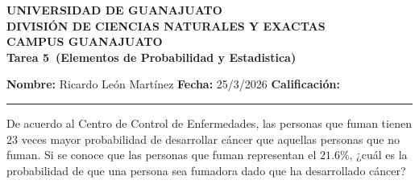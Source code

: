 \documentclass[12pt,a4paper]{article}
\newcommand{\alumno}{Ricardo León Martínez}
\newcommand{\materia}{Elementos de Probabilidad y Estadistica}
\newcommand{\tarea}{Tarea 5}
\newcommand{\fecha}{25/3/2026}
\begin{document}
    \begin{center}
        {\large\textbf{UNIVERSIDAD DE GUANAJUATO}}\\[0.3cm]
        {\normalsize\textbf{DIVISIÓN DE CIENCIAS NATURALES Y EXACTAS}}\\
        {\normalsize\textbf{CAMPUS GUANAJUATO}}\\[1cm]

        {\Large\textbf{\tarea\ (\materia)}}\\[1cm]
    \end{center}

    \noindent
    \textbf{Nombre:} \alumno 
    \hfill 
    \textbf{Fecha:} \fecha 
    \hfill 
    \textbf{Calificación:} \rule{3cm}{0.4pt}

    \vspace{0.3cm}

    \begin{mdframed}[style=mdpinkbox,frametitle={Ejercicio 1}]
        De acuerdo al Centro de Control de Enfermedades, las personas que fuman tienen 23 veces mayor probabilidad de desarrollar cáncer que aquellas personas que no fuman. Si se conoce que las personas que fuman representan el $21.6\%$, ¿cuál es la probabilidad de que una persona sea fumadora dado que ha desarrollado cáncer?
    \end{mdframed}
\end{document}
